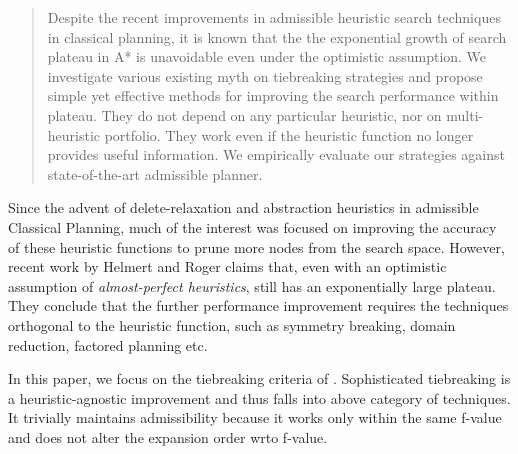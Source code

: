 

\begin{abstract}
Despite the recent improvements in admissible heuristic search techniques
in classical planning, it is known that the the exponential growth of
search plateau in A* is unavoidable even under the optimistic assumption.
We investigate various existing myth on tiebreaking
strategies and propose simple yet effective methods for improving the
search performance within plateau.
 They do not depend on any particular heuristic, nor
 on multi-heuristic portfolio.
 They work even if the heuristic
 function no longer provides useful information.
 We empirically evaluate our strategies against state-of-the-art admissible planner.
\end{abstract}

Since the advent of delete-relaxation and abstraction heuristics in
admissible Classical Planning, much of the interest was focused on improving
the accuracy of these heuristic functions to prune more nodes from the
search space.
% 
However, recent work by Helmert and Roger
 claims that, even with an optimistic
assumption of \emph{almost-perfect heuristics}, \astar still has an
exponentially large plateau. They conclude that the further performance
improvement requires the techniques orthogonal to the heuristic
function, such as symmetry breaking, domain reduction, factored planning
etc.

In this paper, we focus on the tiebreaking criteria of \astar.
Sophisticated tiebreaking is a heuristic-agnostic improvement and thus 
falls into above category of techniques.
It trivially maintains admissibility because it works only within the
same f-value and does not alter the expansion order wrto f-value.




